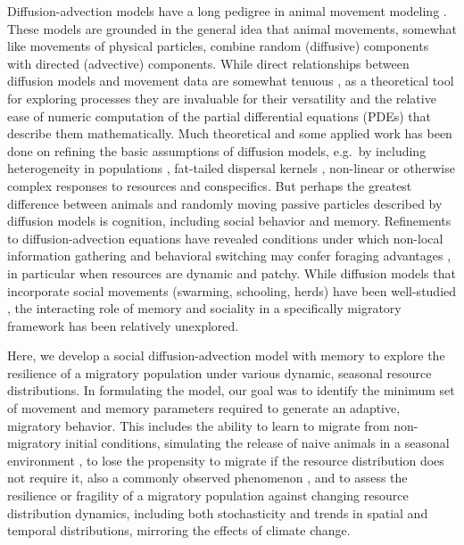 \documentclass[utf8]{frontiersSCNS} %
\begin{document}
Diffusion-advection models have a long pedigree in animal movement modeling \citep{Skellam1951, Turchin1998, Okubo2001}. These models are grounded in the general idea that animal movements, somewhat like movements of physical particles, combine random (diffusive) components with directed (advective) components. While direct relationships between diffusion models and movement data are somewhat tenuous \citep{Gurarie2011,Potts2020}, as a theoretical tool for exploring processes they are invaluable for their versatility and the relative ease of numeric computation of the partial differential equations (PDEs) that describe them mathematically. Much theoretical and some applied work has been done on refining the basic assumptions of diffusion models, e.g.~by including heterogeneity in populations \citep{Skalski2003, Gurarie2009}, fat-tailed dispersal kernels \citep{Kot1996}, non-linear or otherwise complex responses to resources and conspecifics. But perhaps the greatest difference between animals and randomly moving passive particles described by diffusion models is cognition, including social behavior and memory. Refinements to diffusion-advection equations have revealed conditions under which non-local information gathering \citep{Fagan2017} and behavioral switching may confer foraging advantages \citep{Fagan2019}, in particular when resources are dynamic and patchy. While diffusion models that incorporate social movements (swarming, schooling, herds) have been well-studied \citep{Okubo1986,Gruenbaum1994,Mogilner1999}, the interacting role of memory and sociality in a specifically migratory framework has been relatively unexplored. 

Here, we develop a social diffusion-advection model with memory to explore the resilience of a migratory population under various dynamic, seasonal resource distributions. In formulating the model, our goal was to identify the minimum set of movement and memory parameters required to generate an adaptive, migratory behavior. This includes the ability to learn to migrate from non-migratory initial conditions, simulating the release of naive animals in a seasonal environment \citep{Jesmer2018}, to lose the propensity to migrate if the resource distribution does not require it, also a commonly observed phenomenon \citep{Wilcove2008}, and to assess the resilience or fragility of a migratory population against changing resource distribution dynamics, including both stochasticity and trends in spatial and temporal distributions, mirroring the effects of climate change.
\end{document}

